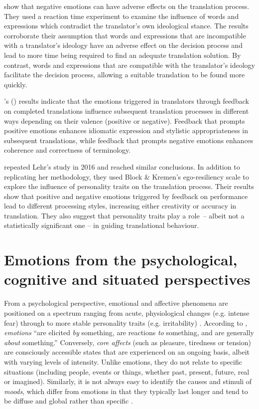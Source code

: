 \documentclass[output=paper]{langscibook}
\begin{document}
\citet{RojoLópez2014} show that negative emotions can have adverse effects on the translation process. They used a reaction time experiment to examine the influence of words and expressions which contradict the translator’s own ideological stance. The results corroborate their assumption that words and expressions that are incompatible with a translator’s ideology have an adverse effect on the decision process and lead to more time being required to find an adequate translation solution. By contrast, words and expressions that are compatible with the translator's ideology facilitate the decision process, allowing a suitable translation to be found more quickly.

\citeauthor{Lehr2014}'s (\citeyear{Lehr2014}) results indicate that the emotions triggered in translators through feedback on completed translations influence subsequent translation processes in different ways depending on their valence (positive or negative). Feedback that prompts positive emotions enhances idiomatic expression and stylistic appropriateness in subsequent translations, while feedback that prompts negative emotions enhances coherence and correctness of terminology.

\citeauthor{RojoLópez2016} repeated Lehr’s study in 2016 and reached similar conclusions. In addition to replicating her methodology, they used Block \& Kremen’s ego-resiliency scale to explore the influence of personality traits on the translation process. Their results show that positive and negative emotions triggered by feedback on performance lead to different processing styles, increasing either creativity or accuracy in translation. They also suggest that personality traits play a role~-- albeit not a statistically significant one -- in guiding translational behaviour.

\section{Emotions from the psychological, cognitive and situated perspectives}
From a psychological perspective, emotional and affective phenomena are positioned on a spectrum ranging from acute, physiological changes (e.g. intense fear) through to more stable personality traits (e.g. irritability) \citep[40]{Davou2007}. According to \citet[322]{Ekkekakis2012}, \textit{emotions} “are elicited \textit{by} something, are reactions \textit{to} something, and are generally \textit{about} something.” Conversely, \textit{core affects} (such as pleasure, tiredness or tension) are consciously accessible states that are experienced on an ongoing basis, albeit with varying levels of intensity. Unlike emotions, they do not relate to specific situations (including people, events or things, whether past, present, future, real or imagined). Similarly, it is not always easy to identify the causes and stimuli of \textit{moods}, which differ from emotions in that they typically last longer and tend to be diffuse and global rather than specific \citep[322]{Ekkekakis2012}.
\end{document}
